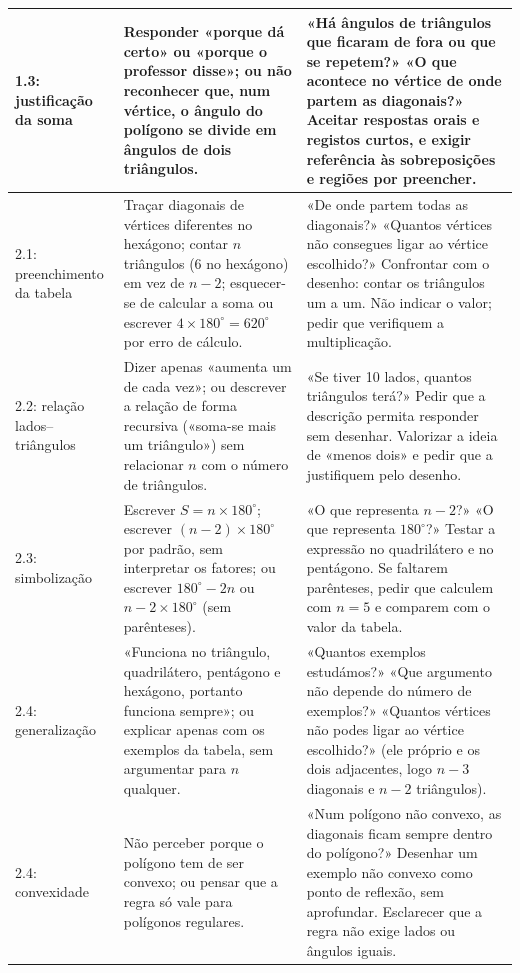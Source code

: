 \begin{longtable}{|p{2.55cm}|p{5.7cm}|p{6.65cm}|}
1.3: justificação da soma&Responder «porque dá certo» ou «porque o professor disse»; ou não reconhecer que, num vértice, o ângulo do polígono se divide em ângulos de dois triângulos.&«Há ângulos de triângulos que ficaram de fora ou que se repetem?» «O que acontece no vértice de onde partem as diagonais?» Aceitar respostas orais e registos curtos, e exigir referência às sobreposições e regiões por preencher.\\\hline
2.1: preenchimento da tabela&Traçar diagonais de vértices diferentes no hexágono; contar $n$ triângulos (6 no hexágono) em vez de $n-2$; esquecer-se de calcular a soma ou escrever $4\times180^\circ=620^\circ$ por erro de cálculo.&«De onde partem todas as diagonais?» «Quantos vértices não consegues ligar ao vértice escolhido?» Confrontar com o desenho: contar os triângulos um a um. Não indicar o valor; pedir que verifiquem a multiplicação.\\\hline
2.2: relação lados--triângulos&Dizer apenas «aumenta um de cada vez»; ou descrever a relação de forma recursiva («soma-se mais um triângulo») sem relacionar $n$ com o número de triângulos.&«Se tiver 10 lados, quantos triângulos terá?» Pedir que a descrição permita responder sem desenhar. Valorizar a ideia de «menos dois» e pedir que a justifiquem pelo desenho.\\\hline
2.3: simbolização&Escrever $S=n\times180^\circ$; escrever $(n-2)\times180^\circ$ por padrão, sem interpretar os fatores; ou escrever $180^\circ-2n$ ou $n-2\times180^\circ$ (sem parênteses).&«O que representa $n-2$?» «O que representa $180^\circ$?» Testar a expressão no quadrilátero e no pentágono. Se faltarem parênteses, pedir que calculem com $n=5$ e comparem com o valor da tabela.\\\hline
2.4: generalização&«Funciona no triângulo, quadrilátero, pentágono e hexágono, portanto funciona sempre»; ou explicar apenas com os exemplos da tabela, sem argumentar para $n$ qualquer.&«Quantos exemplos estudámos?» «Que argumento não depende do número de exemplos?» «Quantos vértices não podes ligar ao vértice escolhido?» (ele próprio e os dois adjacentes, logo $n-3$ diagonais e $n-2$ triângulos).\\\hline
2.4: convexidade&Não perceber porque o polígono tem de ser convexo; ou pensar que a regra só vale para polígonos regulares.&«Num polígono não convexo, as diagonais ficam sempre dentro do polígono?» Desenhar um exemplo não convexo como ponto de reflexão, sem aprofundar. Esclarecer que a regra não exige lados ou ângulos iguais.\\\hline

\end{longtable}

